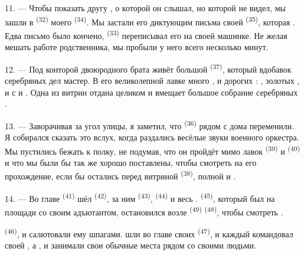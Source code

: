 \VUsaut{3.0mm}

11. --- Чтобы показать другу , о которой он слышал,
но которой не видел, мы зашли в  \textsuperscript{(32)} моего
 \textsuperscript{(34)}. Мы застали его диктующим письма
своей  \textsuperscript{(35)}, которая .
Едва письмо было кончено,  \textsuperscript{(33)} переписывал его
на своей машинке. Не желая мешать работе родственника, мы пробыли у него
всего несколько минут.

12. --- Под конторой двоюродного брата живёт большой
 \textsuperscript{(37)}, который вдобавок серебряных дел
мастер. В его великолепной лавке много ,  и дорогих :
, золотых ,  и
 с  и . Одна
из витрин отдана целиком  и вмещает большое собрание
серебряных .

13. --- Заворачивая за угол улицы, я заметил, что 
\textsuperscript{(36)} рядом с  дома переменили. Я собирался
сказать это вслух, когда раздались весёлые звуки военного оркестра. Мы
пустились бежать к полку, не подумав, что он пройдёт мимо лавок
 \textsuperscript{(39)} и  \textsuperscript{(40)} и
что мы были бы так же хорошо поставлены, чтобы смотреть на его прохождение,
если бы остались перед витриной  \textsuperscript{(38)}, полной
 и .

\VUsaut{3.0mm}

14. --- Во главе  \textsuperscript{(41)} шёл 
\textsuperscript{(42)}, за ним  \textsuperscript{(43)},
 \textsuperscript{(44)} и весь . 
\textsuperscript{(45)}, который был на площади со своим адъютантом, остановился
возле  \textsuperscript{(49)}  \textsuperscript{(48)},
чтобы смотреть .

 \textsuperscript{(46)},  и
 салютовали ему шпагами.  шли во главе
своих  \textsuperscript{(47)}, и каждый 
командовал своей , а ,  и
 занимали свои обычные места рядом со своими людьми.

